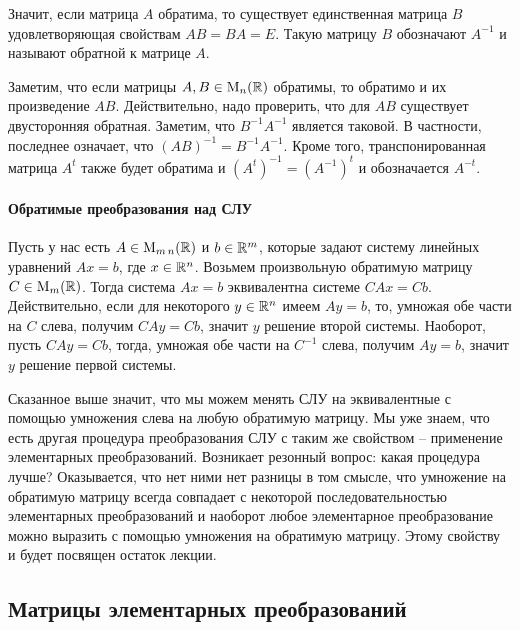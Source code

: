 Значит, если матрица $A$ обратима, то существует единственная матрица $B$ удовлетворяющая свойствам $AB = BA = E$. Такую матрицу $B$ обозначают $A^{-1}$ и называют обратной к матрице $A$. 

Заметим, что если матрицы $A, B\in\operatorname{M}_{n}(\mathbb R)$ обратимы, то обратимо и их произведение $AB$. Действительно, надо проверить, что для $AB$ существует двусторонняя обратная. Заметим, что $B^{-1}A^{-1}$ является таковой. В частности, последнее означает, что $(AB)^{-1} = B^{-1}A^{-1}$. Кроме того, транспонированная матрица $A^t$ также будет обратима и $(A^t)^{-1} = (A^{-1})^t$ и обозначается $A^{-t}$.

\paragraph{Обратимые преобразования над СЛУ} 
Пусть у нас есть $A\in\operatorname{M}_{m\,n}(\mathbb R)$ и $b\in \mathbb R^{m}$, которые задают систему линейных уравнений $Ax = b$, где $x\in \mathbb R^{n}$. Возьмем произвольную обратимую матрицу $C\in\operatorname{M}_{m}(\mathbb R)$. Тогда система $Ax = b$ эквивалентна системе $CAx = Cb$. Действительно, если для некоторого $y\in\mathbb R^{n}$ имеем $Ay = b$, то, умножая обе части на $C$ слева, получим $CAy = Cb$, значит $y$ решение второй системы. Наоборот, пусть $CA y = Cb$, тогда, умножая обе части на $C^{-1}$ слева, получим $Ay =b$, значит $y$ решение первой системы.

Сказанное выше значит, что мы можем менять СЛУ на эквивалентные с помощью умножения слева на любую обратимую матрицу. Мы уже знаем, что есть другая процедура преобразования СЛУ с таким же свойством -- применение элементарных преобразований. Возникает резонный вопрос: какая процедура лучше? Оказывается, что нет ними нет разницы в том смысле, что умножение на обратимую матрицу всегда совпадает с некоторой последовательностью элементарных преобразований и наоборот любое элементарное преобразование можно выразить с помощью умножения на обратимую матрицу. Этому свойству и будет посвящен остаток лекции.

\subsection{Матрицы элементарных преобразований}

